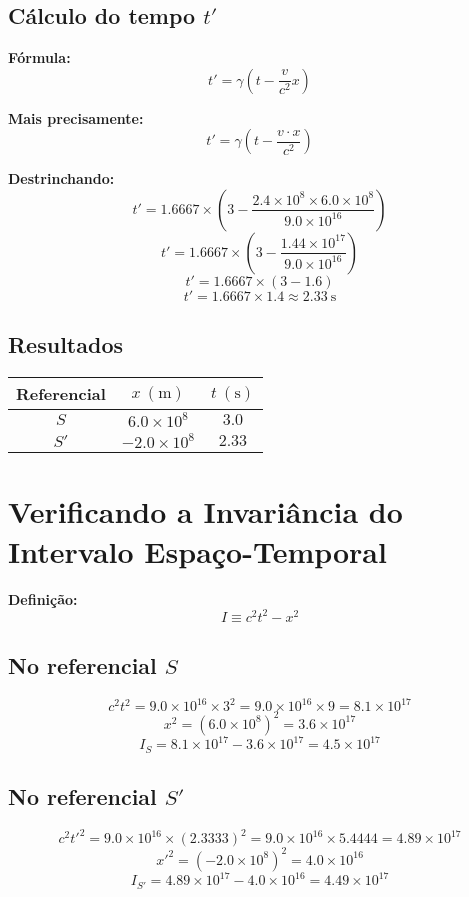 \documentclass[12pt,a4paper]{article}
\begin{document}
\subsection{Cálculo do tempo $t'$}

\textbf{Fórmula:}
\[
t' = \gamma \left(t - \frac{v}{c^2}{x}\right)
\]

\textbf{Mais precisamente:}
\[
t' = \gamma \left(t - \frac{v \cdot x}{c^2}\right)
\]

\textbf{Destrinchando:}
\[
t' = 1.6667 \times \left(3 - \frac{2.4\times10^{8} \times 6.0\times10^{8}}{9.0\times10^{16}}\right)
\]
\[
t' = 1.6667 \times (3 - \frac{1.44\times10^{17}}{9.0\times10^{16}})
\]
\[
t' = 1.6667 \times (3 - 1.6)
\]
\[
t' = 1.6667 \times 1.4 \approx 2.33\ \mathrm{s}
\]

\subsection{Resultados}
\begin{center}
\begin{tabular}{|c|c|c|}
\hline
Referencial & $x\ (\mathrm{m})$ & $t\ (\mathrm{s})$ \\
\hline
$S$ & $6.0\times10^8$ & $3.0$ \\
\hline
$S'$ & $-2.0\times10^8$ & $2.33$ \\
\hline
\end{tabular}
\end{center}

\section{Verificando a Invariância do Intervalo Espaço-Temporal}

\textbf{Definição:}
\[
I \equiv c^2 t^2 - x^2
\]

\subsection{No referencial $S$}
\[
c^2 t^2 = 9.0\times10^{16} \times 3^2 = 9.0\times10^{16}\times9 = 8.1\times10^{17}
\]
\[
x^2 = (6.0\times10^{8})^2 = 3.6\times10^{17}
\]
\[
I_S = 8.1\times10^{17} - 3.6\times10^{17} = 4.5\times10^{17}
\]

\subsection{No referencial $S'$}
\[
c^2 t'^2 = 9.0\times10^{16} \times (2.3333)^2 = 9.0\times10^{16} \times 5.4444 = 4.89\times10^{17}
\]
\[
x'^2 = (-2.0\times10^8)^2 = 4.0\times10^{16}
\]
\[
I_{S'} = 4.89\times10^{17} - 4.0\times10^{16} = 4.49\times10^{17}
\]
\end{document}
